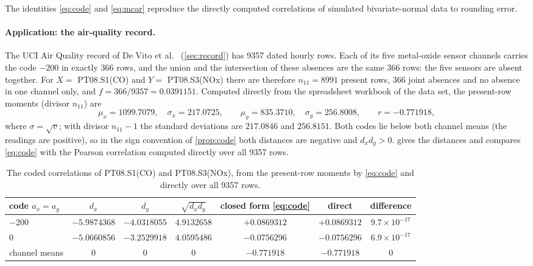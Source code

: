 \documentclass[11pt]{article}
\theoremstyle{definition}\newtheorem{definition}[theorem]{Definition}
\theoremstyle{remark}\newtheorem{remark}[theorem]{Remark}
\begin{document}
The identities \eqref{eq:code} and \eqref{eq:mcar} reproduce the directly computed correlations of simulated bivariate-normal data to rounding error.

\paragraph{Application: the air-quality record.} The UCI Air Quality record of De Vito et al.\ \cite{DeVito,UCI} (\cref{sec:record}) has 9357 dated hourly rows. Each of its five metal-oxide sensor channels carries the code $-200$ in exactly 366 rows, and the union and the intersection of these absences are the same 366 rows: the five sensors are absent together. For $X=$ PT08.S1(CO) and $Y=$ PT08.S3(NOx) there are therefore $n_{11}=8991$ present rows, 366 joint absences and no absence in one channel only, and $f=366/9357=0.0391151$. Computed directly from the spreadsheet workbook of the data set, the present-row moments (divisor $n_{11}$) are
\[
\mu_x=1099.7079,\quad\sigma_x=217.0725,\qquad\mu_y=835.3710,\quad\sigma_y=256.8008,\qquad r=-0.771918,
\]
where $\sigma=\sqrt v$; with divisor $n_{11}-1$ the standard deviations are $217.0846$ and $256.8151$. Both codes lie below both channel means (the readings are positive), so in the sign convention of \cref{prop:code} both distances are negative and $d_xd_y>0$.  gives the distances and compares \eqref{eq:code} with the Pearson correlation computed directly over all 9357 rows.

\begin{table}[htbp]\centering
\caption{The coded correlations of PT08.S1(CO) and PT08.S3(NOx), from the present-row moments by \eqref{eq:code} and directly over all 9357 rows.}\label{tab:codes}
\small
\begin{tabular}{@{}lcccccc@{}}\toprule
code $a_x=a_y$ & $d_x$ & $d_y$ & $\sqrt{d_xd_y}$ & closed form \eqref{eq:code} & direct & difference\\\midrule
$-200$ & $-5.9874368$ & $-4.0318055$ & $4.9132658$ & $+0.0869312$ & $+0.0869312$ & $9.7\times10^{-17}$\\
$0$ & $-5.0660856$ & $-3.2529918$ & $4.0595486$ & $-0.0756296$ & $-0.0756296$ & $6.9\times10^{-17}$\\
channel means & $0$ & $0$ & $0$ & $-0.771918$ & $-0.771918$ & $0$\\\bottomrule
\end{tabular}
\end{table}
\end{document}
